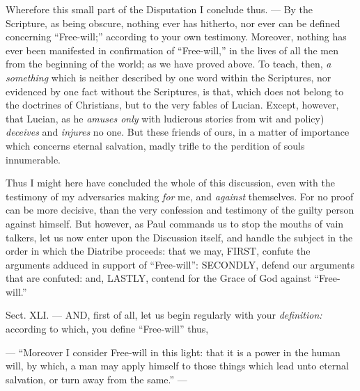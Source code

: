 Wherefore this small part of the Disputation I conclude thus. — By the Scripture, as being obscure, nothing ever has hitherto, nor ever can be defined concerning “Free-will;” according to your own testimony. Moreover, nothing has ever been manifested in confirmation of “Free-will,” in the lives of all the men from the beginning of the world; as we have proved above. To teach, then, \emph{a something }which is neither described by one word within the Scriptures, nor evidenced by one fact without the Scriptures, is that, which does not belong to the doctrines of Christians, but to the very fables of Lucian. Except, however, that Lucian, as he \emph{ amuses only }with ludicrous stories from wit and policy) \emph{deceives }and \emph{injures }no one. But these friends of ours, in a matter of importance which concerns eternal salvation, madly trifle to the perdition of souls innumerable.

Thus I might here have concluded the whole of this discussion, even with the testimony of my adversaries making \emph{for }me, and \emph{against }themselves. For no proof can be more decisive, than the very confession and testimony of the guilty person against himself. But however, as Paul commands us to stop the mouths of vain talkers, let us now enter upon the Discussion itself, and handle the subject in the order in which the Diatribe proceeds: that we may, \textsc{FIRST}, confute the arguments adduced in support of “Free-will”: \textsc{SECONDLY}, defend our arguments that are confuted: and, \textsc{LASTLY}, contend for the Grace of God against “Free-will.”



Sect. XLI. — AND, first of all, let us begin regularly with your \emph{definition: }according to which, you define “Free-will” thus,

— “Moreover I consider Free-will in this light: that it is a power in the human will, by which, a man may apply himself to those things which lead unto eternal salvation, or turn away from the same.” —

